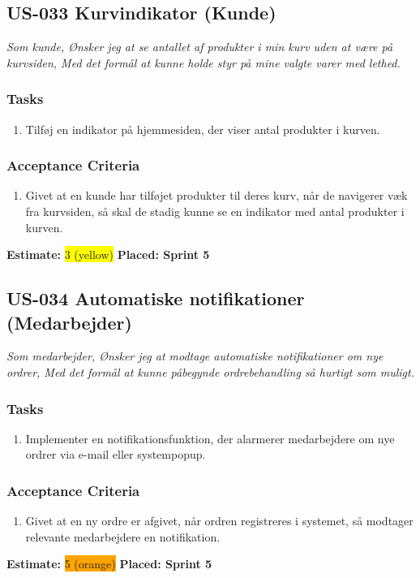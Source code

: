 \subsection{US-033 Kurvindikator (Kunde)}
\label{sec:US-033}
\textit{Som kunde, Ønsker jeg at se antallet af produkter i min kurv uden at være på kurvsiden, Med det formål at kunne holde styr på mine valgte varer med lethed.}
\subsubsection*{\textbf{Tasks}}
\begin{enumerate}
  \item Tilføj en indikator på hjemmesiden, der viser antal produkter i kurven.
\end{enumerate}
\subsubsection*{\textbf{Acceptance Criteria}}
\begin{enumerate}
  \item Givet at en kunde har tilføjet produkter til deres kurv, når de navigerer væk fra kurvsiden, så skal de stadig kunne se en indikator med antal produkter i kurven.
\end{enumerate}
\textbf{Estimate:} \colorbox{yellow}{3 (yellow)}
\textbf{Placed: Sprint 5}
\par\noindent\dotfill

\subsection{US-034 Automatiske notifikationer (Medarbejder)}
\label{sec:US-034}
\textit{Som medarbejder, Ønsker jeg at modtage automatiske notifikationer om nye ordrer, Med det formål at kunne påbegynde ordrebehandling så hurtigt som muligt.}
\subsubsection*{\textbf{Tasks}}
\begin{enumerate}
  \item Implementer en notifikationsfunktion, der alarmerer medarbejdere om nye ordrer via e-mail eller systempopup.
\end{enumerate}
\subsubsection*{\textbf{Acceptance Criteria}}
\begin{enumerate}
  \item Givet at en ny ordre er afgivet, når ordren registreres i systemet, så modtager relevante medarbejdere en notifikation.
\end{enumerate}
\textbf{Estimate:} \colorbox{orange}{5 (orange)}
\textbf{Placed: Sprint 5}
\par\noindent\dotfill

